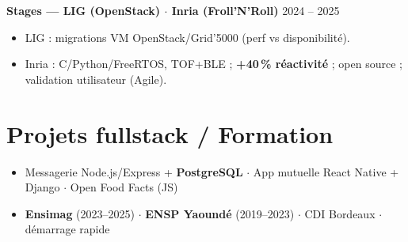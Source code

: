 \documentclass[10pt,a4paper]{article}
\begin{document}
\textbf{Stages --- LIG (OpenStack) $\cdot$ Inria (Froll'N'Roll)} \hfill 2024 -- 2025
\begin{itemize}
  \item LIG : migrations VM OpenStack/Grid'5000 (perf vs disponibilité).
  \item Inria : C/Python/FreeRTOS, TOF+BLE ; \textbf{+40\,\% réactivité} ; open source ; validation utilisateur (Agile).
\end{itemize}

\section*{Projets fullstack / Formation}
\begin{itemize}
  \item Messagerie Node.js/Express + \textbf{PostgreSQL} $\cdot$ App mutuelle React Native + Django $\cdot$ Open Food Facts (JS)
  \item \textbf{Ensimag} (2023--2025) $\cdot$ \textbf{ENSP Yaoundé} (2019--2023) $\cdot$ CDI Bordeaux $\cdot$ démarrage rapide
\end{itemize}
\end{document}
